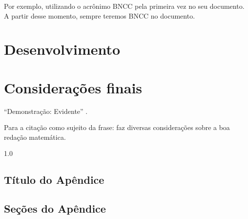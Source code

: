 \documentclass[tcc]{wstex}
\begin{document}
Por exemplo, utilizando o acrônimo \ac{BNCC} pela primeira vez no seu documento. A partir desse momento, sempre teremos \ac{BNCC} no documento.

\chapter{Desenvolvimento}       %

\chapter{Considerações finais}  %

``Demonstração: Evidente'' \cite[p. 154]{elon}.

Para a citação como sujeito da frase: \textcites{cordeiro} faz diversas considerações sobre a boa redação matemática.





\begin{spacing}{1.0}  %
	\printbibliography
\end{spacing}


\begin{appendices}

	\chapter{Título do Apêndice}

	\section{Seções do Apêndice}

\end{appendices}
\end{document}
